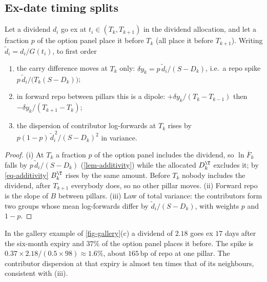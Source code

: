 \subsection{Ex-date timing splits}
\begin{proposition}\label{prop-timing}
Let a dividend $d_i$ go ex at $t_i\in(T_k,T_{k+1})$ in the dividend allocation, and let a fraction $p$ of the option
panel place it before $T_k$ (all place it before $T_{k+1}$). Writing $\tilde d_i=d_i/G(t_i)$, to first order
\begin{enumerate}[label=(\roman*)]
\item the carry difference moves at $T_k$ only: $\delta y_k=p\,\tilde d_i/(S-D_k)$, i.e.\ a repo spike
$p\,\tilde d_i/\bigl(T_k(S-D_k)\bigr)$;
\item in forward repo between pillars this is a dipole: $+\delta y_k/(T_k-T_{k-1})$ then $-\delta y_k/(T_{k+1}-T_k)$;
\item the dispersion of contributor log-forwards at $T_k$ rises by $p(1-p)\,\tilde d_i^{\,2}/(S-D_k)^2$ in variance.
\end{enumerate}
\end{proposition}
\begin{proof}
(i) At $T_k$ a fraction $p$ of the option panel includes the dividend, so $\ln\overline{F}_k$ falls by
$p\,\tilde d_i/(S-D_k)$ (\cref{lem-additivity}) while the allocated $D^\T_k$ excludes it; by \cref{eq-additivity}
$B^\T_k$ rises by the same amount. Before $T_k$ nobody includes the dividend, after $T_{k+1}$ everybody does, so no
other pillar moves. (ii) Forward repo is the slope of $B$ between pillars. (iii) Law of total variance: the
contributors form two groups whose mean log-forwards differ by $\tilde d_i/(S-D_k)$, with weights $p$ and $1-p$.
\end{proof}

\begin{example}\label{ex-timing}
In the gallery example of \cref{fig-gallery}(c) a dividend of $2.18$ goes ex $17$ days after the six-month expiry and
$37\%$ of the option panel places it before. The spike is $0.37\times2.18/(0.5\times98)\approx1.6\%$, about $165$\,bp
of repo at one pillar. The contributor dispersion at that expiry is almost ten times that of its neighbours,
consistent with (iii).
\end{example}

